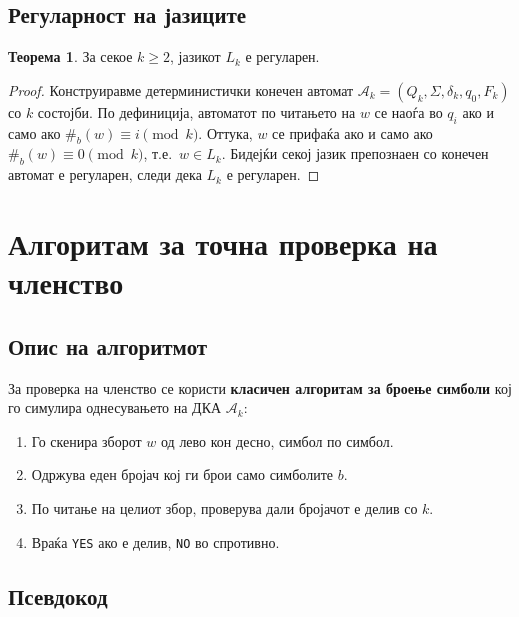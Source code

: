 \documentclass[12pt,a4paper]{article}
\theoremstyle{definition}
\newtheorem{theorem}{Теорема}
\begin{document}
\subsection{Регуларност на јазиците}

\begin{theorem}
За секое $k \geq 2$, јазикот $L_k$ е регуларен.
\end{theorem}

\begin{proof}
Конструиравме детерминистички конечен автомат
$\mathcal{A}_k=(Q_k,\Sigma,\delta_k,q_0,F_k)$ со $k$ состојби.
По дефиниција, автоматот по читањето на $w$ се наоѓа во $q_i$ ако и само ако $\#_b(w)\equiv i \pmod{k}$.
Оттука, $w$ се прифаќа ако и само ако $\#_b(w)\equiv 0 \pmod{k}$, т.е.\ $w\in L_k$.
Бидејќи секој јазик препознаен со конечен автомат е регуларен, следи дека $L_k$ е регуларен.
\end{proof}

\section{Алгоритам за точна проверка на членство}

\subsection{Опис на алгоритмот}

За проверка на членство се користи \textbf{класичен алгоритам за броење симболи} кој го симулира однесувањето на ДКА $\mathcal{A}_k$:

\begin{enumerate}
  \item Го скенира зборот $w$ од лево кон десно, симбол по симбол.
  \item Одржува еден бројач кој ги брои само симболите $b$.
  \item По читање на целиот збор, проверува дали бројачот е делив со $k$.
  \item Враќа \texttt{YES} ако е делив, \texttt{NO} во спротивно.
\end{enumerate}

\subsection{Псевдокод}
\end{document}
